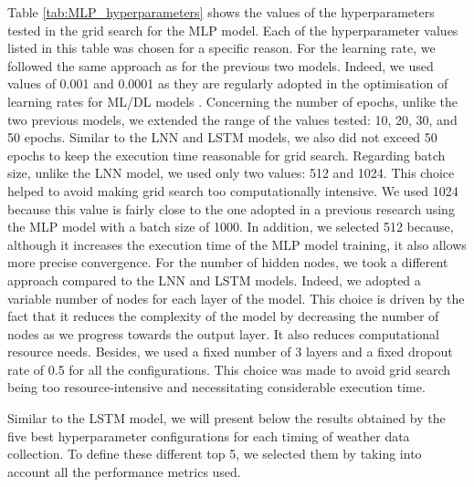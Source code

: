 \documentclass[12pt,oneside]{book} %
\begin{document}
\noindent Table \ref{tab:MLP_hyperparameters} shows the values of the hyperparameters tested in the grid search for the MLP model. Each of the hyperparameter values listed in this table was chosen for a specific reason. For the learning rate, we followed the same approach as for the previous two models. Indeed, we used values of 0.001 and 0.0001 as they are regularly adopted in the optimisation of learning rates for ML/DL models \cite{Bengio2012}. Concerning the number of epochs, unlike the two previous models, we extended the range of the values tested: 10, 20, 30, and 50 epochs. Similar to the LNN and LSTM models, we also did not exceed 50 epochs to keep the execution time reasonable for grid search. Regarding batch size, unlike the LNN model, we used only two values: 512 and 1024. This choice helped to avoid making grid search too computationally intensive. We used 1024 because this value is fairly close to the one adopted in a previous research using the MLP model with a batch size of 1000. In addition, we selected 512 because, although it increases the execution time of the MLP model training, it also allows more precise convergence. For the number of hidden nodes, we took a different approach compared to the LNN and LSTM models. Indeed, we adopted a variable number of nodes for each layer of the model. This choice is driven by the fact that it reduces the complexity of the model by decreasing the number of nodes as we progress towards the output layer. It also reduces computational resource needs. Besides, we used a fixed number of 3 layers and a fixed dropout rate of 0.5 for all the configurations. This choice was made to avoid grid search being too resource-intensive and necessitating considerable execution time.

\noindent Similar to the LSTM model, we will present below the results obtained by the five best hyperparameter configurations for each timing of weather data collection. To define these different top 5, we selected them by taking into account all the performance metrics used.
\end{document}
